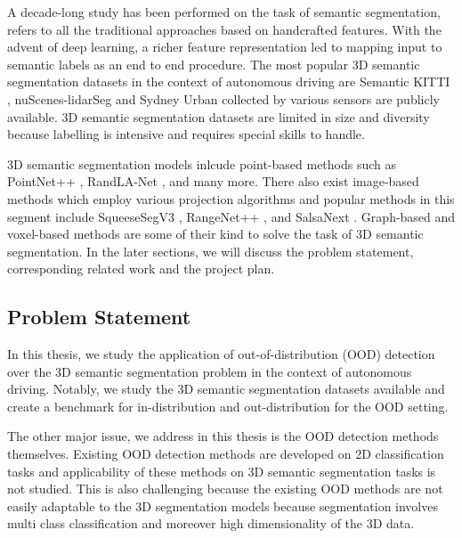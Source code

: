 \documentclass[thesis]{mas_proposal}
\begin{document}
A decade-long study has been performed on the task of semantic segmentation, \cite{ZHU201612} refers to all the traditional approaches based on handcrafted features.
With the advent of deep learning, a richer feature representation led to mapping input to semantic labels as an end to end procedure.
The most popular 3D semantic segmentation datasets in the context of autonomous driving are Semantic KITTI \cite{Behley_2019_ICCV}, nuScenes-lidarSeg \cite{caesar2020nuscenes} and Sydney Urban \cite{de2013unsupervised} collected by various sensors are publicly available.
3D semantic segmentation datasets are limited in size and diversity because labelling is intensive and requires special skills to handle.

3D semantic segmentation models inlcude point-based methods such as PointNet++ \cite{qi2017pointnet++}, RandLA-Net \cite{Hu_2020_CVPR_Randla}, and many more.
There also exist image-based methods which employ various projection algorithms and popular methods in this segment include SqueeseSegV3 \cite{Sequesesegv3_2018}, RangeNet++ \cite{Milioto2019}, and SalsaNext \cite{SalsaNext_2020}.
Graph-based and voxel-based methods are some of their kind to solve the task of 3D semantic segmentation.
In the later sections, we will discuss the problem statement, corresponding related work and the project plan.


\subsection{Problem Statement}
In this thesis, we study the application of out-of-distribution (OOD) detection over the 3D semantic segmentation problem in the context of autonomous driving.
Notably, we study the 3D semantic segmentation datasets available and create a benchmark for in-distribution and out-distribution for the OOD setting.

The other major issue, we address in this thesis is the OOD detection methods themselves.
Existing OOD detection methods are developed on 2D classification tasks and applicability of these methods on 3D semantic segmentation tasks is not studied. 
This is also challenging because the existing OOD methods are not easily adaptable to the 3D segmentation models because segmentation involves multi class classification and moreover high dimensionality of the 3D data.
\newline
\end{document}
